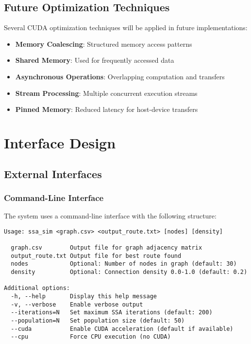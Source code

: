 \documentclass[conference]{IEEEtran}
\begin{document}
\subsection{Future Optimization Techniques}

Several CUDA optimization techniques will be applied in future implementations:

\begin{itemize}
    \item \textbf{Memory Coalescing}: Structured memory access patterns
    \item \textbf{Shared Memory}: Used for frequently accessed data
    \item \textbf{Asynchronous Operations}: Overlapping computation and transfers
    \item \textbf{Stream Processing}: Multiple concurrent execution streams
    \item \textbf{Pinned Memory}: Reduced latency for host-device transfers
\end{itemize}

\section{Interface Design}

\subsection{External Interfaces}

\subsubsection{Command-Line Interface}
The system uses a command-line interface with the following structure:

\begin{lstlisting}[caption=Command Line Interface]
Usage: ssa_sim <graph.csv> <output_route.txt> [nodes] [density]

  graph.csv        Output file for graph adjacency matrix
  output_route.txt Output file for best route found
  nodes            Optional: Number of nodes in graph (default: 30)
  density          Optional: Connection density 0.0-1.0 (default: 0.2)

Additional options:
  -h, --help       Display this help message
  -v, --verbose    Enable verbose output
  --iterations=N   Set maximum SSA iterations (default: 200)
  --population=N   Set population size (default: 50)
  --cuda           Enable CUDA acceleration (default if available)
  --cpu            Force CPU execution (no CUDA)
\end{lstlisting}
\end{document}
